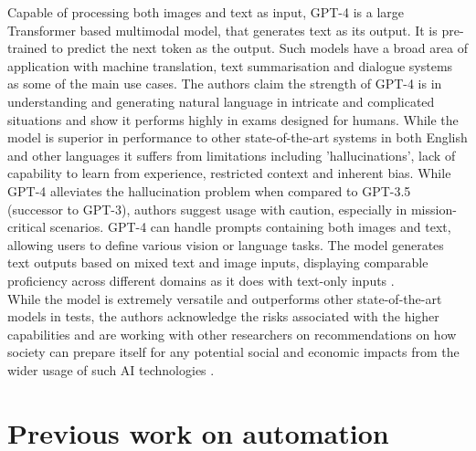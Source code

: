 Capable of processing both images and text as input, GPT-4 \cite{openaiGPT4TechnicalReport2023} is a large Transformer based multimodal model, that generates text as its output. It is pre-trained to predict the next token as the output. Such models have a broad area of application with machine translation, text summarisation and dialogue systems as some of the main use cases. The authors \cite{openaiGPT4TechnicalReport2023} claim the strength of GPT-4 is in understanding and generating natural language in intricate and complicated situations and show it performs highly in exams designed for humans. While the model is superior in performance to other state-of-the-art systems in both English and other languages it suffers from limitations including 'hallucinations', lack of capability to learn from experience,  restricted context and inherent bias. While GPT-4 alleviates the hallucination problem when compared to GPT-3.5 (successor to GPT-3), authors suggest usage with caution, especially in mission-critical scenarios. GPT-4 can handle prompts containing both images and text, allowing users to define various vision or language tasks. The model generates text outputs based on mixed text and image inputs, displaying comparable proficiency across different domains as it does with text-only inputs \cite{openaiGPT4TechnicalReport2023}. \\

While the model is extremely versatile and outperforms other state-of-the-art models in tests, the authors acknowledge the risks associated with the higher capabilities and are working with other researchers on recommendations on how society can prepare itself for any potential social and economic impacts from the wider usage of such AI technologies \cite{openaiGPT4TechnicalReport2023}.

\section{Previous work on automation}

